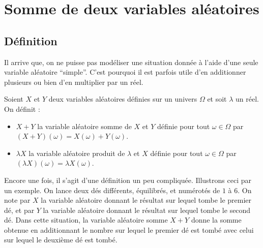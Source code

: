 






	\section{Somme de deux variables aléatoires}

	\subsection{Définition}

	Il arrive que, on ne puisse pas modéliser une situation donnée à l'aide d'une seule variable aléatoire ``simple''. C'est pourquoi il est parfois utile d'en additionner plusieurs ou bien d'en multiplier par un réel.

	\begin{formula}[Définition]
		Soient $X$ et $Y$ deux variables aléatoires définies sur un univers $\Omega$ et soit $\lambda$ un réel. On définit :
		\begin{itemize}
			\item $X + Y$ la variable aléatoire somme de $X$ et $Y$ définie pour tout $\omega \in \Omega$ par $(X + Y)(\omega) = X(\omega) + Y(\omega)$.
			\item $\lambda X$ la variable aléatoire produit de $\lambda$ et $X$ définie pour tout $\omega \in \Omega$ par $(\lambda X)(\omega) = \lambda X(\omega)$.
		\end{itemize}
	\end{formula}

	\begin{tip}[Exemple]
		Encore une fois, il s'agit d'une définition un peu compliquée. Illustrons ceci par un exemple.
		\newpar
		On lance deux dés différents, équilibrés, et numérotés de $1$ à $6$. On note par $X$ la variable aléatoire donnant le résultat sur lequel tombe le premier dé, et par $Y$ la variable aléatoire donnant le résultat sur lequel tombe le second dé.
		\newpar
		Dans cette situation, la variable aléatoire somme $X + Y$ donne la somme obtenue en additionnant le nombre sur lequel le premier dé est tombé avec celui sur lequel le deuxième dé est tombé.
	\end{tip}

